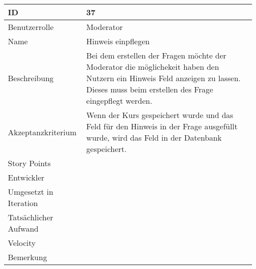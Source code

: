\begin{tabularx}{\textwidth}{|p{}|X|}
	\hline
	ID & 37 \\
	\hline
	Benutzerrolle & Moderator \\
	\hline
	Name & Hinweis einpflegen\\
	\hline
	Beschreibung & Bei dem erstellen der Fragen möchte der Moderator die möglichekeit haben den Nutzern ein Hinweis Feld anzeigen zu lassen. Dieses muss beim erstellen des Frage eingepflegt werden. \\
	\hline
	Akzeptanzkriterium & Wenn der Kurs gespeichert wurde und das Feld für den Hinweis in der Frage ausgefüllt wurde, wird das Feld in der Datenbank gespeichert. \\
	\hline
	Story Points & \\
	\hline
	Entwickler & \\
	\hline
	Umgesetzt in Iteration & \\
	\hline
	Tatsächlicher Aufwand & \\
	\hline
	Velocity & \\
	\hline
	Bemerkung & \\
	\hline
\end{tabularx}
\vspace{20pt}
